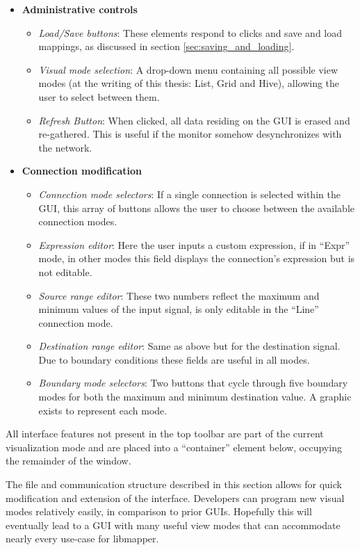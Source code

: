 \begin{itemize}
	\item \textbf{Administrative controls}
	\begin{itemize}
		\item\emph{Load/Save buttons}: These elements respond to clicks and save and load mappings, as discussed in section \ref{sec:saving_and_loading}.
		\item\emph{Visual mode selection}: A drop-down menu containing all possible view modes (at the writing of this thesis: List, Grid and Hive), allowing the user to select between them.
		\item\emph{Refresh Button}: When clicked, all data residing on the GUI is erased and re-gathered. This is useful if the monitor somehow desynchronizes with the network.
	\end{itemize}

	\item \textbf{Connection modification}
	\begin{itemize}
		\item\emph{Connection mode selectors}: If a single connection is selected within the GUI, this array of buttons allows the user to choose between the available connection modes.
		\item\emph{Expression editor}: Here the user inputs a custom expression, if in ``Expr'' mode, in other modes this field displays the connection's expression but is not editable.
		\item\emph{Source range editor}: These two numbers reflect the maximum and minimum values of the input signal, is only editable in the ``Line'' connection mode.
		\item\emph{Destination range editor}: Same as above but for the destination signal. Due to boundary conditions these fields are useful in all modes.
		\item\emph{Boundary mode selectors}: Two buttons that cycle through five boundary modes for both the maximum and minimum destination value. A graphic exists to represent each mode.
	\end{itemize}
\end{itemize}

All interface features not present in the top toolbar are part of the current visualization mode and are placed into a ``container'' element below, occupying the remainder of the window.


The file and communication structure described in this section allows for quick modification and extension of the interface. Developers can program new visual modes relatively easily, in comparison to prior GUIs. Hopefully this will eventually lead to a GUI with many useful view modes that can accommodate nearly every use-case for libmapper.


